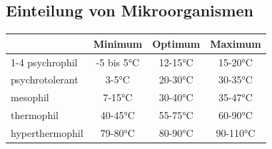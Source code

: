 \documentclass[a4paper,10pt,twoside]{article}
\begin{document}
\subsection{Einteilung von Mikroorganismen}
\ppbig

\begin{center}
\begin{tabular}{l|c|c|c}
 & \textbf{Minimum} &\textbf{Optimum} & \textbf{Maximum} \\
\cline{1-4}
psychrophil & -5 bis 5°C & 12-15°C & 15-20°C \\
psychrotolerant & 3-5°C & 20-30°C & 30-35°C \\
mesophil & 7-15°C & 30-40°C & 35-47°C \\
thermophil & 40-45°C & 55-75°C & 60-90°C \\
hyperthermophil &79-80°C & 80-90°C & 90-110°C \\
\end{tabular}
\end{center}
\end{document}

